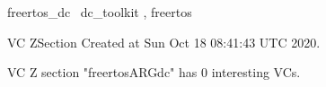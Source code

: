 \documentclass{article}
\begin{document}

\begin{zsection}	 \SECTION freertos\_dc \parents~dc\_toolkit , freertos
\end{zsection}

\newcommand{\appliesTo}{\zbinop{appliesTo}} 
\newcommand{\appliesToNofix}{\zpreop{appliesToNofix}} 

VC ZSection Created at Sun Oct 18 08:41:43 UTC 2020.



 VC Z section "freertosARGdc" has $0$ interesting VCs.



\end{document}
